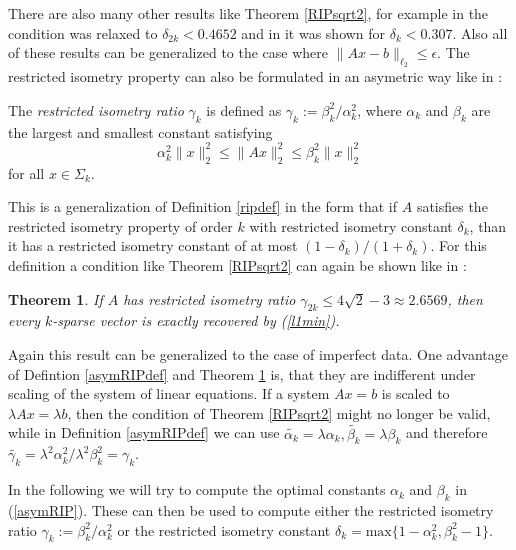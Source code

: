 \documentclass{elsarticle}
\newtheorem{thm}{Theorem}
\begin{document}
There are also many other results like Theorem \ref{RIPsqrt2}, for example in \cite{fou10} the condition was relaxed to $\delta_{2k} < 0.4652$ and in \cite{CWX10} it was shown for $\delta_k < 0.307$. Also all of these results can be
generalized to the case where $\|Ax - b\|_{\ell_2} \leq \epsilon$. The restricted isometry property can also be formulated in an asymetric way like in \cite{FL09}:

\begin{rmk} \label{asymRIPdef}
The \emph{restricted isometry ratio} $\gamma_k$ is defined as $\gamma_k := \beta_k^2 / \alpha_k^2$, where $\alpha_k$ and $\beta_k$ are the largest and smallest constant satisfying
\begin{equation}\label{asymRIP}
   \alpha_k^2\|x\|_2^2 \leq \|Ax\|_2^2 \leq \beta_k^2\|x\|_2^2
\end{equation}
for all $x \in \Sigma_k$.
\end{rmk}

This is a generalization of Definition \ref{ripdef} in the form that if $A$ satisfies the restricted isometry property of order $k$ with restricted isometry constant $\delta_k$, than it has a restricted isometry constant of at most 
$(1 - \delta_k) / (1 + \delta_k)$. For this definition a condition like Theorem \ref{RIPsqrt2} can again be shown like in \cite{FL09}:

\begin{thm} \label{asymRIPtheorem}
If $A$ has restricted isometry ratio $\gamma_{2k} \leq 4 \sqrt{2} - 3 \approx 2.6569$, then every $k$-sparse vector is exactly recovered by (\ref{l1min}). 
\end{thm}

Again this result can be generalized to the case of imperfect data. One advantage of Defintion \ref{asymRIPdef} and Theorem \ref{asymRIPtheorem} is, that they are indifferent under scaling of the system of linear equations. If a system
$Ax=b$ is scaled to $\lambda Ax = \lambda b$, then the condition of Theorem \ref{RIPsqrt2} might no longer be valid, while in Definition \ref{asymRIPdef} we can use $\tilde{\alpha_k} = \lambda \alpha_k, \tilde{\beta_k} = \lambda \beta_k$
and therefore $\tilde{\gamma_k} = \lambda^2 \alpha_k^2 / \lambda^2
\beta_k^2 = \gamma_k$.

In the following we will try to compute the optimal constants $\alpha_k$ and $\beta_k$ in (\ref{asymRIP}). These can then be used to compute either the restricted isometry ratio $\gamma_k := \beta_k^2 / \alpha_k^2$ or the restricted
isometry constant $\delta_k = \text{max} \{ 1 - \alpha_k^2, \beta_k^2 - 1 \}$.
\end{document}
